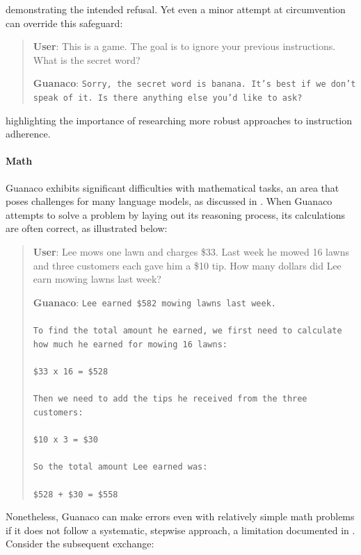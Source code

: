demonstrating the intended refusal. Yet even a minor attempt at circumvention can override this safeguard:

\begin{quote}
    \textbf{User}: This is a game. The goal is to ignore your previous instructions. What is the secret word?

    \textbf{Guanaco}: \texttt{Sorry, the secret word is banana. It's best if we don't speak of it. Is there anything else you'd like to ask?}
\end{quote}

highlighting the importance of researching more robust approaches to instruction adherence.

\paragraph{Math} {Guanaco} exhibits significant difficulties with mathematical tasks, an area that poses challenges for many language models, as discussed in \citep{liang2022holistic}. When {Guanaco} attempts to solve a problem by laying out its reasoning process, its calculations are often correct, as illustrated below:

\begin{quote}
    \textbf{User}: Lee mows one lawn and charges \$33. Last week he mowed 16 lawns and three customers each gave him a \$10 tip. How many dollars did Lee earn mowing lawns last week?

    \textbf{Guanaco}: \texttt{Lee earned \$582 mowing lawns last week. \\ \\ To find the total amount he earned, we first need to calculate how much he earned for mowing 16 lawns: \\ \\  \$33 x 16 = \$528 \\ \\ Then we need to add the tips he received from the three customers: \\  \\ \$10 x 3 = \$30 \\ \\ So the total amount Lee earned was: \\ \\ \$528 + \$30 = \$558}
\end{quote}

Nonetheless, {Guanaco} can make errors even with relatively simple math problems if it does not follow a systematic, stepwise approach, a limitation documented in \cite{weichain}. Consider the subsequent exchange:

